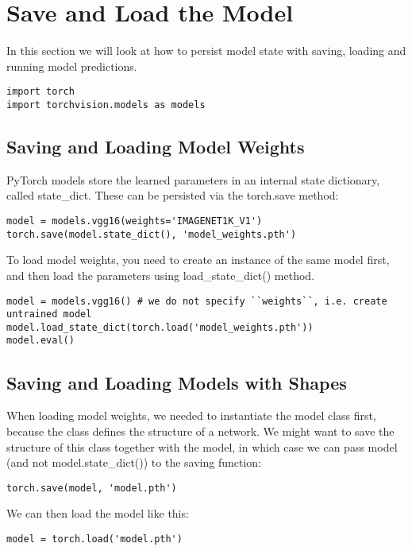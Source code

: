 \documentclass{article}
\begin{document}
\section{Save and Load the Model}

In this section we will look at how to persist model state with saving, loading and 
running model predictions.

\begin{lstlisting}
import torch
import torchvision.models as models
\end{lstlisting}

\subsection{Saving and Loading Model Weights}

PyTorch models store the learned parameters in an internal state dictionary, 
called state\_dict. These can be persisted via the torch.save method:

\begin{lstlisting}
model = models.vgg16(weights='IMAGENET1K_V1')
torch.save(model.state_dict(), 'model_weights.pth')
\end{lstlisting}

To load model weights, you need to create an instance of the same model first, and 
then load the parameters using load\_state\_dict() method.

\begin{lstlisting}
model = models.vgg16() # we do not specify ``weights``, i.e. create untrained model
model.load_state_dict(torch.load('model_weights.pth'))
model.eval()
\end{lstlisting}

\subsection{Saving and Loading Models with Shapes}

When loading model weights, we needed to instantiate the model class first, because the 
class defines the structure of a network. We might want to save the structure of this 
class together with the model, in which case we can pass model 
(and not model.state\_dict()) to the saving function:

\begin{lstlisting}
torch.save(model, 'model.pth')
\end{lstlisting}

We can then load the model like this:

\begin{lstlisting}
model = torch.load('model.pth')
\end{lstlisting}
\end{document}
